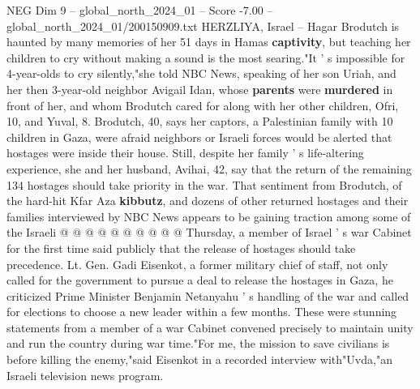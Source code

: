 \begin{textsample}{NEG Dim 9 – global\_north\_2024\_01 – Score -7.00 – global\_north\_2024\_01/200150909.txt}  \label{ex:f9_neg_197}
HERZLIYA, Israel -- Hagar Brodutch is haunted by many memories of her 51 days in Hamas \textbf{captivity}, but teaching her children to cry without making a sound is the most searing."It ' s impossible for 4-year-olds to cry silently,"she told NBC News, speaking of her son Uriah, and her then 3-year-old neighbor Avigail Idan, whose \textbf{parents} were \textbf{murdered} in front of her, and whom Brodutch cared for along with her other children, Ofri, 10, and Yuval, 8.
Brodutch, 40, says her captors, a Palestinian family with 10 children in Gaza, were afraid neighbors or Israeli forces would be alerted that hostages were inside their house.
Still, despite her family ' s life-altering experience, she and her husband, Avihai, 42, say that the return of the remaining 134 hostages should take priority in the war.
That sentiment from Brodutch, of the hard-hit Kfar Aza \textbf{kibbutz}, and dozens of other returned hostages and their families interviewed by NBC News appears to be gaining traction among some of the Israeli @ @ @ @ @ @ @ @ @ @ Thursday, a member of Israel ' s war Cabinet for the first time said publicly that the release of hostages should take precedence.
Lt.
Gen.
Gadi Eisenkot, a former military chief of staff, not only called for the government to pursue a deal to release the hostages in Gaza, he criticized Prime Minister Benjamin Netanyahu ' s handling of the war and called for elections to choose a new leader within a few months.
These were stunning statements from a member of a war Cabinet convened precisely to maintain unity and run the country during war time."For me, the mission to save civilians is before killing the enemy,"said Eisenkot in a recorded interview with"Uvda,"an Israeli television news program.

\end{textsample}
